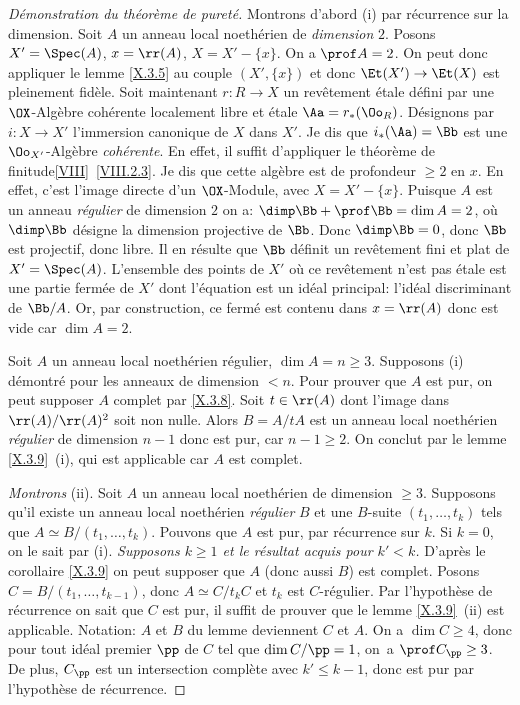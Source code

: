 \begin{proof}[D\'emonstration du th\'eor\`eme de puret\'e]
Montrons d'abord (i) par r\'ecurrence sur la dimension. Soit $A$ un anneau local noeth\'erien de \emph{dimension} $2$. Posons $X'=\Spec(A)$, $x=\rr(A)$, $X=X'-\{x\}$. On a $\prof A=2$. On peut donc appliquer le lemme \ref{X.3.5} au couple $(X', \{x\})$ et donc $\Et(X')\to\Et(X)$ est pleinement fid\`ele. Soit maintenant $r\colon R\to X$ un rev\^etement \'etale d\'efini par une $\OX$-Alg\`ebre coh\'erente localement libre et \'etale $\Aa=r_\ast(\Oo_R)$. D\'esignons par $i\colon X\to X'$ l'immersion canonique de $X$ dans $X'$. Je dis que $i_\ast(\Aa)=\Bb$ est une $\Oo_{X'}$-Alg\`ebre \emph{cohérente}. En effet, il suffit d'appliquer le \og th\'eor\`eme de finitude\fg \ref{VIII}~\ref{VIII.2.3}. Je dis que cette alg\`ebre est de profondeur $\geq 2$ en $x$. En effet, c'est l'image directe d'un $\OX$-Module, avec $X=X'-\{x\}$. Puisque $A$ est un anneau \emph{régulier} de dimension $2$ on a: $\dimp \Bb + \prof\Bb=\dim A=2$, o\`u $\dimp\Bb$ d\'esigne la dimension projective de $\Bb$. Donc $\dimp\Bb=0$, donc $\Bb$ est projectif, donc libre. Il en r\'esulte que $\Bb$ d\'efinit un rev\^etement fini et plat de $X'=\Spec(A)$. L'ensemble des points de $X'$ o\`u ce rev\^etement n'est pas \'etale est une partie ferm\'ee de $X'$ dont l'\'equation est un id\'eal principal: l'id\'eal discriminant de $\Bb/A$. Or, par construction, ce ferm\'e est contenu dans $x=\rr(A)$ donc est vide car $\dim A=2$.

Soit $A$ un anneau local noeth\'erien r\'egulier, $\dim A=n\geq3$. Supposons (i) d\'emontr\'e pour les anneaux de dimension $<n$. Pour prouver que $A$ est pur, on peut supposer $A$ complet par \ref{X.3.8}. Soit $t\in\rr(A)$ dont l'image dans $\rr(A)/\rr(A)^2$ soit non nulle. Alors $B=A/tA$ est un anneau local noeth\'erien \emph{régulier} de dimension $n-1$ donc est pur, car $n-1\geq2$. On conclut par le lemme \ref{X.3.9}~(i), qui est applicable car $A$ est complet.

\emph{Montrons} (ii). Soit $A$ un anneau local noeth\'erien de dimension $\geq 3$. Supposons qu'il existe un anneau local noeth\'erien \emph{régulier} $B$ et une $B$-suite $(t_1, \ldots, t_k)$ tels que $A\simeq B/(t_1, \ldots, t_k)$. Pouvons que $A$ est pur, par r\'ecurrence sur $k$. Si $k=0$, on le sait par (i). \emph{Supposons $k\geq1$ et le résultat acquis pour $k'<k$.} D'apr\`es le corollaire \ref{X.3.9} on peut supposer que $A$ (donc aussi $B$) est complet. Posons $C=B/(t_1, \ldots, t_{k-1})$, donc $A\simeq C/t_kC$ et $t_k$ est $C$-r\'egulier. Par l'hypoth\`ese de r\'ecurrence on sait que $C$ est pur, il suffit de prouver que le lemme \ref{X.3.9}~(ii) est applicable. Notation: $A$ et $B$ du lemme deviennent $C$ et $A$. On a $\dim C\geq4$, donc pour tout id\'eal premier $\pp$ de $C$ tel que $\dim C/\pp=1$, on~a $\prof C_\pp\geq3$. De plus, $C_\pp$ est un intersection compl\`ete avec $k'\leq k-1$, donc est pur par l'hypoth\`ese de r\'ecurrence.
\end{proof}


